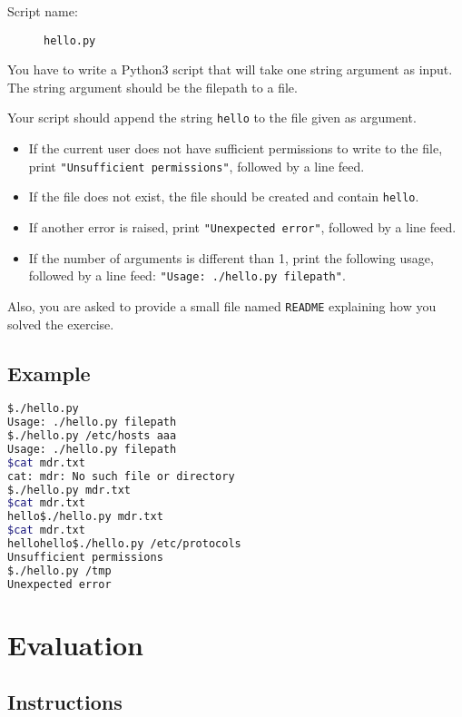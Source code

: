 \documentclass[12pt]{article}
\begin{document}
\begin{description}
        \item[Script name:] \texttt{hello.py}
\end{description}

You have to write a Python3 script that will take one string argument as input. The string argument should be the filepath to a file.

Your script should append the string \texttt{hello} to the file given as argument.

\begin{itemize}
\item If the current user does not have sufficient permissions to write to the file, print \texttt{"Unsufficient permissions"}, followed by a line feed.

\item If the file does not exist, the file should be created and contain \texttt{hello}.

\item If another error is raised, print \texttt{"Unexpected error"}, followed by a line feed.

\item If the number of arguments is different than 1, print the following usage, followed by a line feed: \texttt{"Usage: ./hello.py filepath"}.
\end{itemize}

Also, you are asked to provide a small file named \texttt{README} explaining how you solved the exercise.

\subsection{Example}

\begin{lstlisting}[language=bash]
$./hello.py 
Usage: ./hello.py filepath
$./hello.py /etc/hosts aaa
Usage: ./hello.py filepath
$cat mdr.txt
cat: mdr: No such file or directory
$./hello.py mdr.txt
$cat mdr.txt
hello$./hello.py mdr.txt
$cat mdr.txt
hellohello$./hello.py /etc/protocols
Unsufficient permissions
$./hello.py /tmp
Unexpected error
\end{lstlisting}

\section{Evaluation}
\subsection{Instructions}
\end{document}
